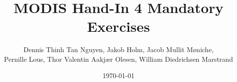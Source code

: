 \documentclass{article}
\author{Dennis Thinh Tan Nguyen, Jakob Holm, Jacob Mullit Møniche,\\
		Pernille Lous, Thor Valentin Aakjær Olesen, William Diedrichsen Marstrand}
\date{\today}
\title{MODIS Hand-In 4 Mandatory Exercises}
\begin{document}
	\maketitle
	\tableofcontents
	\pagebreak
	
	
	
	
	
	
	
	
	
	
	
	
	
\end{document}
